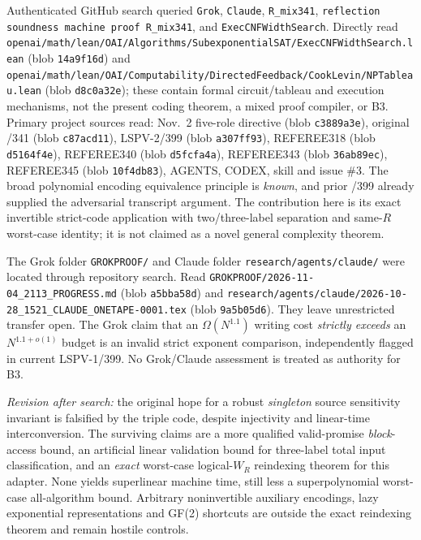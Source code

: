 \documentclass[11pt]{article}
\begin{document}
Authenticated GitHub search queried \texttt{Grok}, \texttt{Claude}, \texttt{R\_mix341}, \texttt{reflection soundness machine proof R\_mix341}, and \texttt{ExecCNFWidthSearch}. Directly read \texttt{openai/math/lean/OAI/Algorithms/SubexponentialSAT/ExecCNFWidthSearch.lean} (blob \texttt{14a9f16d}) and \texttt{openai/math/lean/OAI/Computability/DirectedFeedback/CookLevin/NPTableau.lean} (blob \texttt{d8c0a32e}); these contain formal circuit/tableau and execution mechanisms, not the present coding theorem, a mixed proof compiler, or B3. Primary project sources read: Nov.\ 2 five-role directive (blob \texttt{c3889a3e}), original /341 (blob \texttt{c87acd11}), LSPV-2/399 (blob \texttt{a307ff93}), REFEREE318 (blob \texttt{d5164f4e}), REFEREE340 (blob \texttt{d5fcfa4a}), REFEREE343 (blob \texttt{36ab89ec}), REFEREE345 (blob \texttt{10f4db83}), AGENTS, CODEX, skill and issue \#3. The broad polynomial encoding equivalence principle is \emph{known}, and prior /399 already supplied the adversarial transcript argument. The contribution here is its exact invertible strict-code application with two/three-label separation and same-\(R\) worst-case identity; it is not claimed as a novel general complexity theorem.

The Grok folder \texttt{GROKPROOF/} and Claude folder \texttt{research/agents/claude/} were located through repository search. Read \texttt{GROKPROOF/2026-11-04\_2113\_PROGRESS.md} (blob \texttt{a5bba58d}) and \texttt{research/agents/claude/2026-10-28\_1521\_CLAUDE\_ONETAPE-0001.tex} (blob \texttt{9a5b05d6}). They leave unrestricted transfer open. The Grok claim that an \(\Omega(N^{1.1})\) writing cost \emph{strictly exceeds} an \(N^{1.1+o(1)}\) budget is an invalid strict exponent comparison, independently flagged in current LSPV-1/399. No Grok/Claude assessment is treated as authority for B3.

\emph{Revision after search:} the original hope for a robust \emph{singleton} source sensitivity invariant is falsified by the triple code, despite injectivity and linear-time interconversion. The surviving claims are a more qualified valid-promise \emph{block}-access bound, an artificial linear validation bound for three-label total input classification, and an \emph{exact} worst-case logical-\(W_R\) reindexing theorem for this adapter. None yields superlinear machine time, still less a superpolynomial worst-case all-algorithm bound. Arbitrary noninvertible auxiliary encodings, lazy exponential representations and GF(2) shortcuts are outside the exact reindexing theorem and remain hostile controls.
\end{document}
